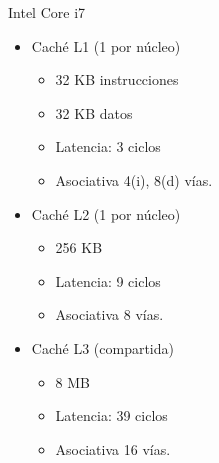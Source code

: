 \begin{frame}[t]{Intel Core i7}
\begin{itemize}
  \item Caché L1 (1 por núcleo)
    \begin{itemize}
      \item 32 KB instrucciones
      \item 32 KB datos
      \item Latencia: 3 ciclos
      \item Asociativa 4(i), 8(d) vías. 
    \end{itemize}

  \item Caché L2 (1 por núcleo)
    \begin{itemize}
      \item 256 KB
      \item Latencia: 9 ciclos
      \item Asociativa 8 vías.
    \end{itemize}

  \item Caché L3 (compartida)
    \begin{itemize}
      \item 8 MB
      \item Latencia: 39 ciclos
      \item Asociativa 16 vías.
    \end{itemize}
\end{itemize}
\end{frame}
